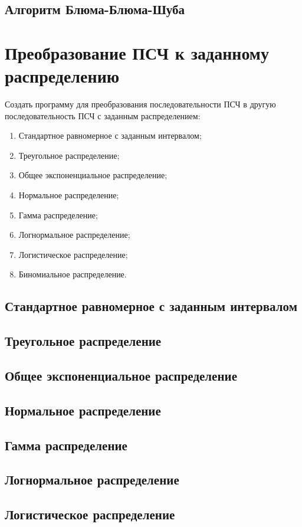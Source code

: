 \documentclass[bachelor, och, labwork]{SCWorks}
\begin{document}
\subsection{Алгоритм Блюма-Блюма-Шуба}

\section{Преобразование ПСЧ к заданному распределению}
Создать программу для преобразования последовательности ПСЧ в другую последовательность
ПСЧ с заданным распределением:
\begin{enumerate}
  \item Стандартное равномерное с заданным интервалом;
  \item Треугольное распределение;
  \item Общее экспоненциальное распределение;
  \item Нормальное распределение;
  \item Гамма распределение;
  \item Логнормальное распределение;
  \item Логистическое распределение;
  \item Биномиальное распределение.
\end{enumerate}

\subsection{Стандартное равномерное с заданным интервалом}
\subsection{Треугольное распределение}
\subsection{Общее экспоненциальное распределение}
\subsection{Нормальное распределение}
\subsection{Гамма распределение}
\subsection{Логнормальное распределение}
\subsection{Логистическое распределение}
\end{document}
